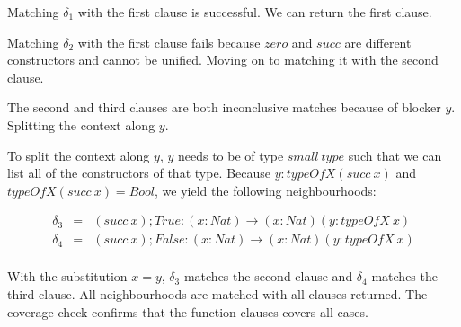 Matching $\delta_1$ with the first clause is successful. We can return the first clause. 

Matching $\delta_2$ with the first clause fails because $zero$ and $succ$ are different constructors and cannot be unified. Moving on to matching it with the second clause.

The second and third clauses are both inconclusive matches because of blocker $y$. Splitting the context along $y$.

To split the context along $y$, $y$ needs to be of type $small \ type$ such that we can list all of the constructors of that type. Because $y : typeOfX (succ \ x)$ and $typeOfX (succ \ x) = Bool$, we yield the following neighbourhoods:

\begin{figure}[H]
  \begin{equation*}
    \begin{aligned}
      \delta_3 & = & (succ \ x);True : (x : Nat) \to (x : Nat)(y : typeOfX \ x) \\
      \delta_4 & = & (succ \ x);False : (x: Nat) \to (x : Nat)(y : typeOfX \ x) \\
    \end{aligned}
  \end{equation*}
\end{figure}

With the substitution $x = y$, $\delta_3$ matches the second clause and $\delta_4$ matches the third clause. All neighbourhoods are matched with all clauses returned. The coverage check confirms that the function clauses covers all cases.

